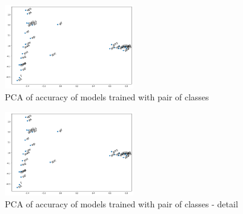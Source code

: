 \noindent
\begin{figure}[htb!]
\centering\includegraphics[width=0.50\textwidth]{content/pca.png}
\caption{\label{fig:pca}PCA of accuracy of models trained with pair of classes}%
\end{figure}


\noindent
\begin{figure}[htb!]
\centering\includegraphics[width=0.50\textwidth]{content/pca.png}
\caption{\label{fig:pca2}PCA of accuracy of models trained with pair of classes - detail}%
\end{figure}


